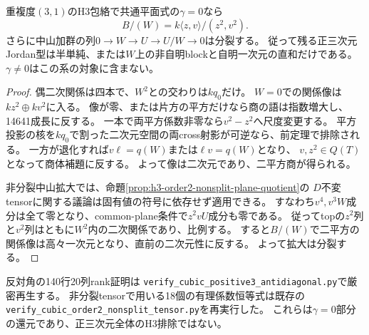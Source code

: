 \begin{corollary}\label{cor:h3-positive3-two-square-quotient}
重複度$(3,1)$のH3包絡で共通平面式の$\gamma=0$なら
\[
 B/(W)=k\langle z,v\rangle/(z^2,v^2).
\]
さらに中山加群の列$0\to W\to U\to U/W\to0$は分裂する。
従って残る正三次元Jordan型は半単純、または$W$上の非自明blockと自明一次元の直和だけである。
$\gamma\ne0$はこの系の対象に含まない。
\end{corollary}
\begin{proof}
偶二次関係は四本で、$W^2$との交わりは$kq_0$だけ。
$W=0$での関係像は$kz^2\oplus kv^2$に入る。
像が零、または片方の平方だけなら商の語は指数増大し、14641成長に反する。
一本で両平方係数非零なら$v^2-z^2$へ尺度変更する。
平方投影の核を$kq_0$で割った二次元空間の両cross射影が可逆なら、前定理で排除される。
一方が退化すれば$v\ell=q(W)$または$\ell v=q(W)$となり、
$v,z^2\in Q(T)$となって商体補題に反する。
よって像は二次元であり、二平方商が得られる。

非分裂中山拡大では、命題\ref{prop:h3-order2-nonsplit-plane-quotient}の
$D$不変tensorに関する議論は固有値の符号に依存せず適用できる。
すなわち$v^4,v^3W$成分は全て零となり、common-plane条件で$z^2vU$成分も零である。
従ってtopの$z^2$列と$v^2$列はともに$W^2$内の二次関係であり、比例する。
すると$B/(W)$で二平方の関係像は高々一次元となり、直前の二次元性に反する。
よって拡大は分裂する。
\end{proof}

反対角の140行20列rank証明は
\texttt{verify\_cubic\_positive3\_antidiagonal.py}で厳密再生する。
非分裂tensorで用いる18個の有理係数恒等式は既存の
\texttt{verify\_\allowbreak{}cubic\_\allowbreak{}order2\_\allowbreak{}nonsplit\_\allowbreak{}tensor.py}を再実行した。
これらは$\gamma=0$部分の還元であり、正三次元全体のH3排除ではない。
